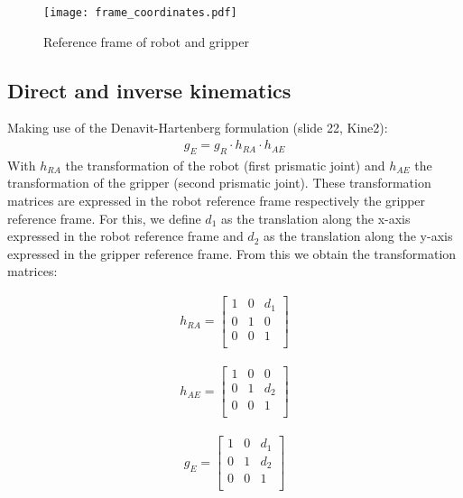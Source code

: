 \documentclass{article}
\begin{document}
	\begin{figure}[H]
		\centering
		\texttt{[image: frame\_coordinates.pdf]}
		\caption{Reference frame of robot and gripper}
		\label{fig:framecoordinates}
	\end{figure}
	
	\subsection{Direct and inverse kinematics}
	
	Making use of the Denavit-Hartenberg formulation (slide 22, Kine2):
	\begin{align}
	g_{E}=g_{R} \cdot h_{RA} \cdot h_{AE}
	\label{eq1}
	\end{align}
	With $h_{RA}$ the transformation of the robot (first prismatic joint) and $h_{AE}$ the transformation of the gripper (second prismatic joint). These transformation matrices are expressed in the robot reference frame respectively the gripper reference frame. For this, we define $d_{1}$ as the translation along the x-axis expressed in the robot reference frame and $d_{2}$ as the translation along the y-axis expressed in the gripper reference frame. From this we obtain the transformation matrices:
	\begin{minipage}[t]{.33\textwidth-.5\columnsep}
		\centering
		\begin{eqnarray}
		h_{RA} = 
		\begin{bmatrix}
		1 & 0 & d_{1}\\
		0 & 1 & 0 \\
		0 & 0 & 1 \\
		\end{bmatrix} \nonumber
		\end{eqnarray}
	\end{minipage}%
	\begin{minipage}[t]{.33\textwidth-.5\columnsep}
		\centering
		\begin{eqnarray}
		h_{AE} = 
		\begin{bmatrix}
		1 & 0 & 0 \\
		0 & 1 & d_{2} \\
		0 & 0 & 1 \\
		\end{bmatrix} \nonumber
		\end{eqnarray}
	\end{minipage}
	\begin{minipage}[t]{.33\textwidth-.5\columnsep}
		\centering
		\begin{eqnarray}
		g_{E} = 
		\begin{bmatrix}
		1 & 0 & d_{1} \\
		0 & 1 & d_{2} \\
		0 & 0 & 1 \\
		\end{bmatrix} \nonumber
		\end{eqnarray}
	\end{minipage}\\
\end{document}
